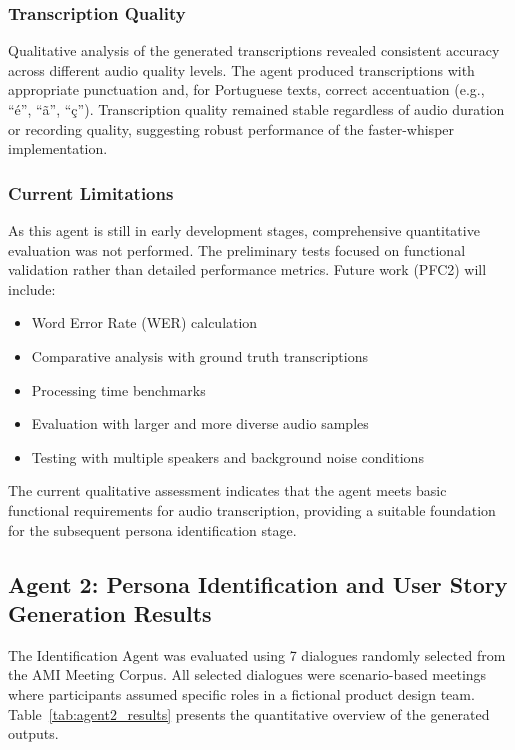 \documentclass[12pt]{article}
\begin{document}
\subsubsection{Transcription Quality}

Qualitative analysis of the generated transcriptions revealed consistent accuracy across different audio quality levels. The agent produced transcriptions with appropriate punctuation and, for Portuguese texts, correct accentuation (e.g., ``é'', ``ã'', ``ç''). Transcription quality remained stable regardless of audio duration or recording quality, suggesting robust performance of the faster-whisper implementation.

\subsubsection{Current Limitations}

As this agent is still in early development stages, comprehensive quantitative evaluation was not performed. The preliminary tests focused on functional validation rather than detailed performance metrics. Future work (PFC2) will include:

\begin{itemize}
    \item Word Error Rate (WER) calculation
    \item Comparative analysis with ground truth transcriptions
    \item Processing time benchmarks
    \item Evaluation with larger and more diverse audio samples
    \item Testing with multiple speakers and background noise conditions
\end{itemize}

The current qualitative assessment indicates that the agent meets basic functional requirements for audio transcription, providing a suitable foundation for the subsequent persona identification stage.

\subsection{Agent 2: Persona Identification and User Story Generation Results}
\label{sec:results_agent2}

The Identification Agent was evaluated using 7 dialogues randomly selected from the AMI Meeting Corpus. All selected dialogues were scenario-based meetings where participants assumed specific roles in a fictional product design team. Table~\ref{tab:agent2_results} presents the quantitative overview of the generated outputs.
\end{document}
